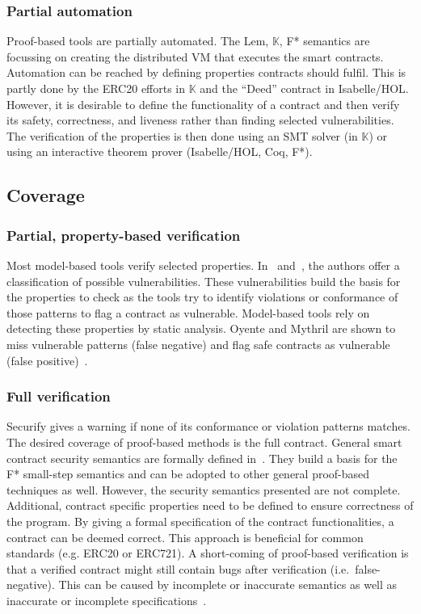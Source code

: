 \subsubsection{Partial automation}
Proof-based tools are partially automated. The Lem, $\mathbb{K}$, F* semantics are focussing on creating the distributed VM that executes the smart contracts. Automation can be reached by defining properties contracts should fulfil. This is partly done by the ERC20 efforts in $\mathbb{K}$ and the ``Deed'' contract in Isabelle/HOL. However, it is desirable to define the functionality of a contract and then verify its safety, correctness, and liveness rather than finding selected vulnerabilities. The verification of the properties is then done using an SMT solver (in $\mathbb{K}$) or using an interactive theorem prover (Isabelle/HOL, Coq, F*).

\subsection{Coverage} 
\subsubsection{Partial, property-based verification}
Most model-based tools verify selected properties. In~\cite{Atzei2017} and~\cite{Luu2016}, the authors offer a classification of possible vulnerabilities. These vulnerabilities build the basis for the properties to check as the tools try to identify violations or conformance of those patterns to flag a contract as vulnerable.
Model-based tools rely on detecting these properties by static analysis. 
Oyente and Mythril are shown to miss vulnerable patterns (false negative) and flag safe contracts as vulnerable (false positive)~\cite{Tsankov2017}.

\subsubsection{Full verification}
Securify gives a warning if none of its conformance or violation patterns matches.
The desired coverage of proof-based methods is the full contract. 
General smart contract security semantics are formally defined in~\cite{Grishchenko2018}. They build a basis for the F* small-step semantics and can be adopted to other general proof-based techniques as well.
However, the security semantics presented are not complete.
Additional, contract specific properties need to be defined to ensure correctness of the program.
By giving a formal specification of the contract functionalities, a contract can be deemed correct. This approach is beneficial for common standards (e.g. ERC20 or ERC721). 
A short-coming of proof-based verification is that a verified contract might still contain bugs after verification (i.e.\ false-negative). 
This can be caused by incomplete or inaccurate semantics as well as inaccurate or incomplete specifications~\cite{Hirai2016}.

